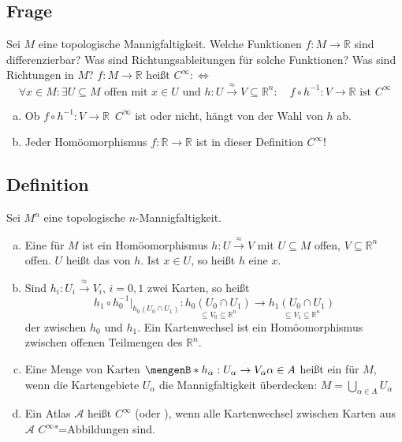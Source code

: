 \subsection[Frage zur Differenzierbarkeit von Funktionen auf Mannigfaltigkeiten]{Frage} %
\label{sub:151}
Sei $M$ eine topologische Mannigfaltigkeit. Welche Funktionen $f : M \to \mathds{R}$ sind differenzierbar? Was sind Richtungsableitungen für solche Funktionen? Was sind 
Richtungen in $M$?
$f : M \to \mathds{R}$ heißt $C^\infty :\Leftrightarrow$
\[
	\forall x \in M : \exists  U \subseteq M \text{ offen mit } x \in U \text { und } h : U \xrightarrow{\approx}  V \subseteq \mathds{R}^n : \quad 
	f \circ h ^{-1} : V \to \mathds{R} \text{ ist } C^\infty
\]
\begin{enumerate}[a)]
	\item Ob $f \circ h ^{-1} : V \to \mathds{R}$ $\, C^\infty$ ist oder nicht, hängt von der Wahl von $h$ ab.
	\item Jeder Homöomorphismus $f : \mathds{R} \to \mathds{R}$ ist in dieser Definition $C^\infty$!
\end{enumerate}

\subsection[Definition: Karten, Kartenwechsel, Atlanten]{Definition} %
\label{sub:152}
Sei $M^n$ eine topologische $n$-Mannigfaltigkeit. 
\begin{enumerate}[a)]
	\item Eine  für $M$ ist ein Homöomorphismus $h : U \xrightarrow{\approx}V$ mit $U \subseteq M$ offen, $V\subseteq\mathds{R}^n$ offen. $U$ heißt das 
	 von $h$. Ist $x \in U$, so heißt $h$ eine  $x$.
	\item Sind $h_i : U_i \xrightarrow{\approx} V_i$, $i=0,1$ zwei Karten, so heißt 
	\[
		h_1 \circ h_0 ^{-1}\big|_{h_0(U_0 \cap U_1)} : \underset{\subseteq V_0 \subseteq \mathds{R}^n}{h_0(U_0 \cap U_1)} \to \underset{\subseteq V_1 \subseteq 
		\mathds{R}^n}{h_1 (U_0 \cap U_1)}
	\]
	der  zwischen $h_0$ und $h_1$. Ein Kartenwechsel ist ein Homöomorphismus zwischen offenen Teilmengen des $\mathds{R}^n$. 
	\item Eine Menge von Karten $\set[h_\alpha : U_\alpha \to V_\alpha]{\alpha \in A}$ heißt ein  für $M$, wenn die Kartengebiete $U_\alpha$ die 
	Mannigfaltigkeit überdecken:
	\(
		M = \bigcup_{\alpha \in A} U_\alpha
	\)
	\item Ein Atlas $\mathcal{A}$ heißt $C^\infty$ (oder ), wenn alle Kartenwechsel zwischen Karten aus $\mathcal{A}$ 
	$C^\infty$"=Abbildungen sind.
\end{enumerate}

